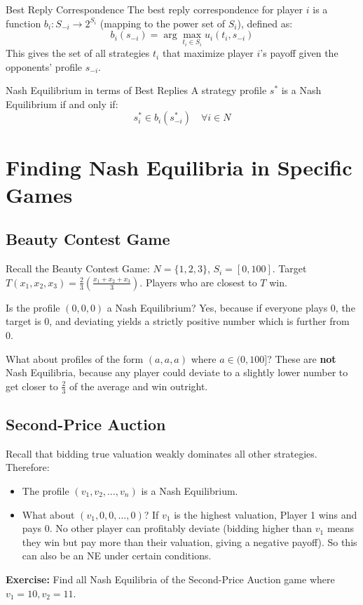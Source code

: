 \documentclass[12pt, a4paper]{article}
\begin{document}
\begin{defbox}{Best Reply Correspondence}
  The best reply correspondence for player $i$ is a function $b_i: S_{-i} \to 2^{S_i}$ (mapping to the power set of $S_i$), defined as:
  \[
    b_i(s_{-i}) = \arg\max_{t_i \in S_i} u_i(t_i, s_{-i})
  \]
  This gives the set of all strategies $t_i$ that maximize player $i$'s payoff given the opponents' profile $s_{-i}$.
\end{defbox}

\begin{thmbox}{Nash Equilibrium in terms of Best Replies}
  A strategy profile $s^*$ is a Nash Equilibrium if and only if:
  \[
    s_i^* \in b_i(s^*_{-i}) \quad \forall i \in N
  \]
\end{thmbox}

\section{Finding Nash Equilibria in Specific Games}

\subsection{Beauty Contest Game}
Recall the Beauty Contest Game: $N = \{1, 2, 3\}$, $S_i = [0, 100]$.
Target $T(x_1, x_2, x_3) = \frac{2}{3} \left( \frac{x_1 + x_2 + x_3}{3} \right)$.
Players who are closest to $T$ win. 

Is the profile $(0, 0, 0)$ a Nash Equilibrium? Yes, because if everyone plays 0, the target is 0, and deviating yields a strictly positive number which is further from 0.

What about profiles of the form $(a, a, a)$ where $a \in (0, 100]$? These are \textbf{not} Nash Equilibria, because any player could deviate to a slightly lower number to get closer to $\frac{2}{3}$ of the average and win outright.

\subsection{Second-Price Auction}
Recall that bidding true valuation weakly dominates all other strategies. Therefore:
\begin{itemize}
    \item The profile $(v_1, v_2, \dots, v_n)$ is a Nash Equilibrium.
    \item What about $(v_1, 0, 0, \dots, 0)$? If $v_1$ is the highest valuation, Player 1 wins and pays 0. No other player can profitably deviate (bidding higher than $v_1$ means they win but pay more than their valuation, giving a negative payoff). So this can also be an NE under certain conditions.
\end{itemize}
\textbf{Exercise:} Find all Nash Equilibria of the Second-Price Auction game where $v_1 = 10, v_2 = 11$.
\end{document}
